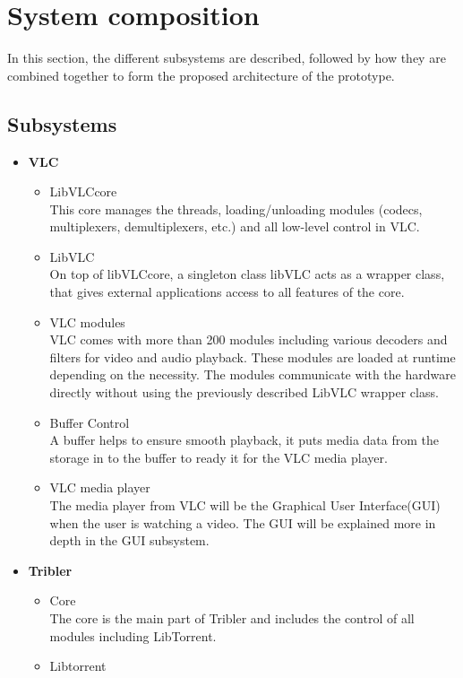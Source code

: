 \section{System composition}
In this section, the different subsystems are described, followed by how they are combined together to form the proposed architecture of the prototype.
\subsection{Subsystems}
\begin{itemize}
\item \textbf{VLC}
	\begin{itemize}
		\item LibVLCcore\\
This core manages the threads, loading/unloading modules (codecs, multiplexers, demultiplexers, etc.) and all low-level control in VLC.
		\item LibVLC\\
On top of libVLCcore, a singleton class libVLC acts as a wrapper class, that gives external applications access to all features of the core.
		\item VLC modules\\
VLC comes with more than 200 modules including various decoders and filters for video and audio playback. These modules are loaded at runtime depending on the necessity. The modules communicate with the hardware directly without using the previously described LibVLC wrapper class.
		\item Buffer Control\\
A buffer helps to ensure smooth playback, it puts media data from the storage in to the buffer to ready it for the VLC media player.
		\item VLC media player\\
The media player from VLC will be the Graphical User Interface(GUI) when the user is watching a video. The GUI will be explained more in depth in the GUI subsystem.
	\end{itemize}
\item \textbf{Tribler}
	\begin{itemize}
		\item Core\\
The core is the main part of Tribler and includes the control of all modules including LibTorrent.
		\item Libtorrent\\

\end{itemize}
\end{itemize}
